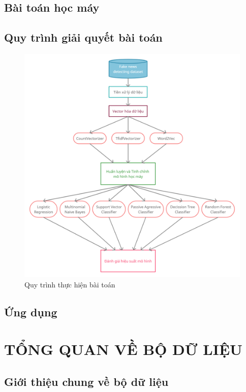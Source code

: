 \documentclass[12pt,a4paper,oneside]{book}
\begin{document}
	\section{Bài toán học máy}
	
	\section{Quy trình giải quyết bài toán}
	
	\begin{figure}[H]
		\begin{center}
			\includegraphics[width=0.88\columnwidth]{QuyTrinhHMTK}
		\end{center}
		\caption{Quy trình thực hiện bài toán}
	\end{figure}
	\section{Ứng dụng}



\chapter{TỔNG QUAN VỀ BỘ DỮ LIỆU}

	

	\section{Giới thiệu chung về bộ dữ liệu}
\end{document}
